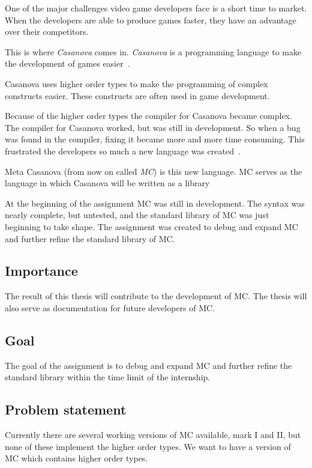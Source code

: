 One of the major challenges video game developers face is a short time to market.
When the developers are able to produce games faster, they have an advantage over their competitors.

This is where \emph{Casanova} comes in.
\emph{Casanova} is a programming language to make the development of games easier~\cite{maggiore2011designing}.

Casanova uses higher order types to make the programming of complex constructs easier.
These constructs are often used in game development.

Because of the higher order types the compiler for Casanova became complex.
The compiler for Casanova worked, but was still in development.
So when a bug was found in the compiler, fixing it became more and more time consuming.
This frustrated the developers so much a new language was created~\cite{giuseppe2015mc}.

Meta Casanova (from now on called \emph{MC}) is this new language.
MC serves as the language in which Casanova will be written as a library

At the beginning of the assignment MC was still in development.
The syntax was nearly complete, but untested, and the standard library of MC was just beginning to take shape.
The assignment was created to debug and expand MC and further refine the standard library of MC.


\subsection{Importance}
The result of this thesis will contribute to the development of MC.
The thesis will also serve as documentation for future developers of MC.

\subsection{Goal}\label{sec:goalsmandate}
The goal of the assignment is to debug and expand MC and further refine the standard library within the time limit of the internship.

\subsection{Problem statement}
Currently there are several working versions of MC available, mark I and II, but none of these implement the higher order types.
We want to have a version of MC which contains higher order types.

